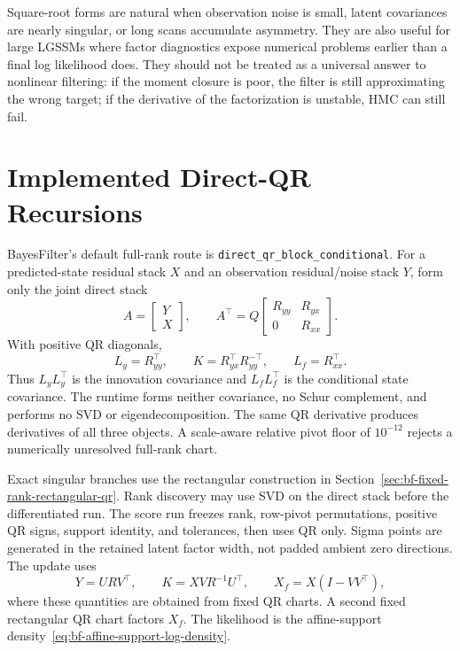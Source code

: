 Square-root forms are natural when observation noise is small, latent
covariances are nearly singular, or long scans accumulate asymmetry.  They are
also useful for large LGSSMs where factor diagnostics expose numerical problems
earlier than a final log likelihood does.  They should not be treated as a
universal answer to nonlinear filtering: if the moment closure is poor, the
filter is still approximating the wrong target; if the derivative of the
factorization is unstable, HMC can still fail.

\section{Implemented Direct-QR Recursions}
\label{sec:bf-srukf-implemented-direct-qr}

BayesFilter's default full-rank route is
\texttt{direct\_qr\_block\_conditional}.  For a predicted-state residual stack
\(X\) and an observation residual/noise stack \(Y\), form only the joint direct
stack
\[
 A=\begin{bmatrix}Y\\X\end{bmatrix},\qquad
 A^\top=Q
 \begin{bmatrix}R_{yy}&R_{yx}\\0&R_{xx}\end{bmatrix}.
\]
With positive QR diagonals,
\begin{equation}
\label{eq:bf-srukf-direct-block-qr}
 L_y=R_{yy}^\top,\qquad
 K=R_{yx}^\top R_{yy}^{-\top},\qquad
 L_f=R_{xx}^\top.
\end{equation}
Thus \(L_yL_y^\top\) is the innovation covariance and \(L_fL_f^\top\) is the
conditional state covariance.  The runtime forms neither covariance, no Schur
complement, and performs no SVD or eigendecomposition.  The same QR derivative
produces derivatives of all three objects.  A scale-aware relative pivot floor
of \(10^{-12}\) rejects a numerically unresolved full-rank chart.

Exact singular branches use the rectangular construction in
Section~\ref{sec:bf-fixed-rank-rectangular-qr}.  Rank discovery may use SVD on
the direct stack before the differentiated run.  The score run freezes rank,
row-pivot permutations, positive QR signs, support identity, and tolerances,
then uses QR only.  Sigma points are generated in the retained latent factor
width, not padded ambient zero directions.  The update uses
\[
 Y=URV^\top,\qquad
 K=XV R^{-1}U^\top,\qquad
 X_f=X(I-VV^\top),
\]
where these quantities are obtained from fixed QR charts.  A second fixed
rectangular QR chart factors \(X_f\).  The likelihood is the affine-support
density~\eqref{eq:bf-affine-support-log-density}.

